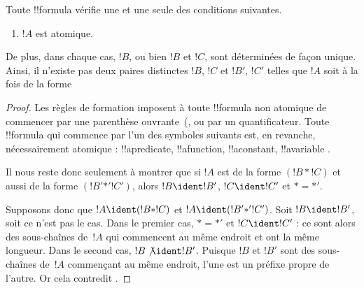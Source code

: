 \documentclass[../../../include/open-logic-section]{subfiles}
\begin{document}
\begin{prop}
Toute !!{formula} vérifie une et une seule des conditions suivantes.
\begin{enumerate}
\item $!A$ est atomique.







\end{enumerate}
De plus, dans chaque cas, $!B$, ou bien $!B$ et $!C$, sont déterminées
de façon unique. Ainsi, il n'existe pas deux paires distinctes $!B$,
$!C$ et $!B'$, $!C'$ telles que $!A$ soit à la fois de la forme
\end{prop}

\begin{proof}
Les règles de formation imposent à toute !!{formula} non atomique de
commencer par une parenthèse ouvrante~(, 
ou par un quantificateur. Toute !!{formula} qui commence par l'un des
symboles suivants est, en revanche, nécessairement atomique :
!!a{predicate}, !!a{function}, !!a{constant}, !!a{variable}%
.

Il nous reste donc seulement à montrer que si $!A$ est de la forme
$(!B \ast !C)$ et aussi de la forme $(!B' \mathbin{\ast'} !C')$,
alors $!B \ident !B'$, $!C \ident !C'$ et $\ast = {\ast'}$.

Supposons donc que $!A \ident (!B \ast !C)$ et
$!A \ident (!B' \mathbin{\ast'} !C')$. Soit $!B \ident !B'$, soit
ce n'est pas le cas. Dans le premier cas, $\ast = {\ast'}$ et
$!C \ident !C'$ : ce sont alors des sous-chaînes de~$!A$ qui
commencent au même endroit et ont la même longueur. Dans le second
cas, $!B \not\ident !B'$. Puisque $!B$ et $!B'$ sont des sous-chaînes
de~$!A$ commençant au même endroit, l'une est un préfixe propre de
l'autre. Or cela contredit .
\end{proof}
\end{document}
